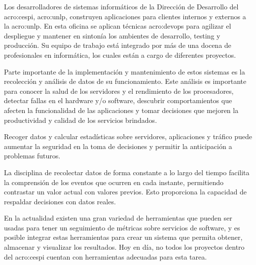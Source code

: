 Los desarrolladores de sistemas informáticos de la Dirección de Desarrollo del
\gls{acro:cespi}, \gls{acro:unlp}, construyen aplicaciones para clientes
internos y externos a la \gls{acro:unlp}. En esta oficina se aplican técnicas
\gls{acro:devops} para agilizar el despliegue y mantener en sintonía los
ambientes de desarrollo, testing y producción. Su equipo de trabajo está
integrado por más de una docena de profesionales en informática, los cuales
están a cargo de diferentes proyectos.

Parte importante de la implementación y mantenimiento de estos sistemas es la
recolección y análisis de datos de su funcionamiento. Este análisis es
importante para conocer la salud de los servidores y el rendimiento de los
procesadores, detectar fallas en el hardware y/o software, descubrir
comportamientos que afecten la funcionalidad de las aplicaciones y tomar
decisiones que mejoren la productividad y calidad de los servicios brindados.

Recoger datos y calcular estadísticas sobre servidores, aplicaciones y tráfico
puede aumentar la seguridad en la toma de decisiones y permitir la anticipación
a problemas futuros.

La disciplina de recolectar datos de forma constante a lo largo del tiempo
facilita la comprensión de los eventos que ocurren en cada instante,
permitiendo contrastar un valor actual con valores previos. Esto proporciona la
capacidad de respaldar decisiones con datos reales.

En la actualidad existen una gran variedad de herramientas que pueden ser
usadas para tener un seguimiento de métricas sobre servicios de software, y es
posible integrar estas herramientas para crear un sistema que permita obtener,
almacenar y visualizar los resultados. Hoy en día, no todos los proyectos
dentro del \gls{acro:cespi} cuentan con herramientas adecuadas para esta tarea.


